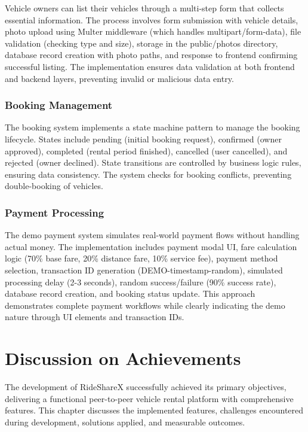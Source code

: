 \documentclass[12pt,a4paper]{report}
\begin{document}
	Vehicle owners can list their vehicles through a multi-step form that collects essential information. The process involves form submission with vehicle details, photo upload using Multer middleware (which handles multipart/form-data), file validation (checking type and size), storage in the public/photos directory, database record creation with photo paths, and response to frontend confirming successful listing. The implementation ensures data validation at both frontend and backend layers, preventing invalid or malicious data entry.
	
	\subsection{Booking Management}
	
	The booking system implements a state machine pattern to manage the booking lifecycle. States include pending (initial booking request), confirmed (owner approved), completed (rental period finished), cancelled (user cancelled), and rejected (owner declined). State transitions are controlled by business logic rules, ensuring data consistency. The system checks for booking conflicts, preventing double-booking of vehicles.
	
	\subsection{Payment Processing}
	
	The demo payment system simulates real-world payment flows without handling actual money. The implementation includes payment modal UI, fare calculation logic (70\% base fare, 20\% distance fare, 10\% service fee), payment method selection, transaction ID generation (DEMO-timestamp-random), simulated processing delay (2-3 seconds), random success/failure (90\% success rate), database record creation, and booking status update. This approach demonstrates complete payment workflows while clearly indicating the demo nature through UI elements and transaction IDs.
	
	
	\chapter{Discussion on Achievements}
	
	The development of RideShareX successfully achieved its primary objectives, delivering a functional peer-to-peer vehicle rental platform with comprehensive features. This chapter discusses the implemented features, challenges encountered during development, solutions applied, and measurable outcomes.
	
\end{document}
